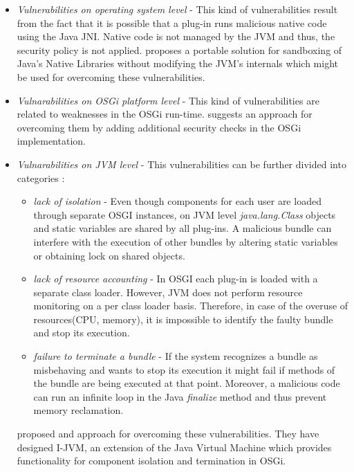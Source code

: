 \begin{itemize}

	\item \textit{Vulnerabilities on operating system level} - This kind of vulnerabilities result from the fact that it is possible that a plug-in runs malicious native code using the Java JNI. Native code is not managed by the JVM and thus, the security policy is not applied. \cite{sun2012jvm} proposes a portable solution for sandboxing of Java's Native Libraries without modifying the JVM's internals which might be used for overcoming these vulnerabilities.
	
	\item \textit{Vulnarabilities on OSGi platform level} - This kind of vulnerabilities are related to weaknesses in the OSGi run-time. \cite{parrend2009security} suggests an approach for overcoming them by adding additional security checks in the OSGi implementation.
	
	\item \textit{Vulnarabilities on JVM level} - This vulnerabilities can be further divided into categories \cite{geoffray2009jvm}: 
	
	\begin{itemize}
		\item \textit{lack of isolation} - Even though components for each user are loaded through separate OSGI instances, on JVM level \textit{java.lang.Class} objects and static variables are shared by all plug-ins. A malicious bundle can interfere with the execution of other bundles by altering static variables or obtaining lock on shared objects.
		
		\item \textit{lack of resource accounting} - In OSGI each plug-in is loaded with a separate class loader. However, JVM does not perform resource monitoring on a per class loader basis. Therefore, in case of the overuse of resources(CPU, memory), it is impossible to identify the faulty bundle and stop its execution.
		
		\item \textit{failure to terminate a bundle} -  If the system recognizes a bundle as misbehaving and wants to stop its
execution it might fail if methods of the bundle are being executed at that point. Moreover, a malicious code can run an infinite loop in the Java \textit{finalize} method and thus prevent memory reclamation.
		
	\end{itemize}
	
	\cite{geoffray2009jvm} proposed and approach for overcoming these vulnerabilities. They have designed I-JVM, an extension of the Java Virtual Machine which provides functionality for component isolation and termination in OSGi.
	
\end{itemize}

